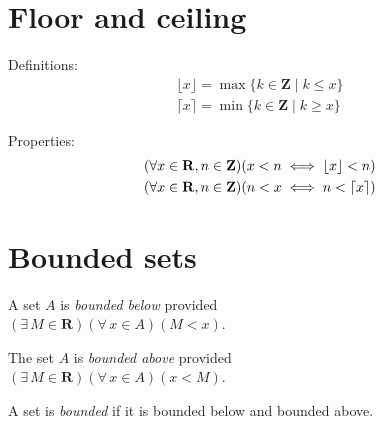 \documentclass[letterpaper,landscape,9pt,fleqn]{extarticle}
\newcommand{\reals}{\mathbf{R}}
\newcommand{\integers}{\mathbf{Z}}
\DeclarePairedDelimiter{\parens}{\lparen}{\rparen}
\begin{document}
\begin{multicols*}{3}
\section*{Floor and ceiling}

\noindent Definitions:
\begin{align*}
    \lfloor x \rfloor = \max \{k \in \integers \mid  k \leq x \} \\
    \lceil x \rceil = \min  \{k \in \integers \mid  k \geq x \}   
\end{align*}

\noindent Properties:
\begin{align*}
   & \parens*{\forall x \in \reals, n \in \integers} \parens*{x < n \iff  \lfloor x \rfloor < n}\\
   & \parens*{\forall x \in \reals, n \in \integers} \parens*{n < x \iff  n < \lceil  x \rceil}\\
\end{align*}
  
\section*{Bounded sets}
\begin{description}[\itemsep=0em]
    \item[Bounded below] A set $A$ is \emph{bounded below} provided\\
        \((\exists \, M \in \reals)(\forall \, x \in A)(M < x)\).

    \item[Bounded above] The set $A$ is \emph{bounded above} provided\\
        \((\exists \, M \in \reals)(\forall \, x \in A)(x < M ) \).
        
    \item[Bounded] A set is \emph{bounded} if it is bounded below and bounded above.

\end{description}


\end{multicols*}
\end{document}
